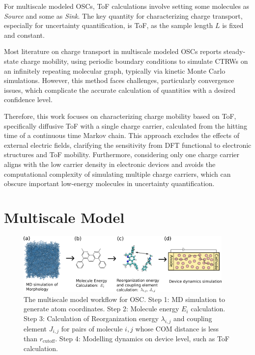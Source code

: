 \documentclass[letterpaper,12pt]{article}
\begin{document}
For multiscale modeled OSCs, ToF calculations involve setting some molecules as \textit{Source} and some as \textit{Sink}. The key quantity for characterizing charge transport, especially for uncertainty quantification, is ToF, as the sample length $L$ is fixed and constant.

Most literature on charge transport in multiscale modeled OSCs reports steady-state charge mobility, using periodic boundary conditions to simulate CTRWs on an infinitely repeating molecular graph, typically via kinetic Monte Carlo simulations. However, this method faces challenges, particularly convergence issues, which complicate the accurate calculation of quantities with a desired confidence level.

Therefore, this work focuses on characterizing charge mobility based on ToF, specifically diffusive ToF with a single charge carrier, calculated from the hitting time of a continuous time Markov chain. This approach excludes the effects of external electric fields, clarifying the sensitivity from DFT functional to electronic structures and ToF mobility. 
Furthermore, considering only one charge carrier aligns with the low carrier density in electronic devices and avoids the computational complexity of simulating multiple charge carriers, which can obscure important low-energy molecules in uncertainty quantification.

\section{Multiscale Model}
\label{sec:MSM}

\begin{figure}[h]
    \centering
    \includegraphics[width=0.95\textwidth]{figs/MSM.png}
    \caption{The multiscale model workflow for OSC. Step 1: MD simulation to generate atom coordinates. Step 2: Molecule energy $E_i$ calculation. Step 3: Calculation of Reorganization energy $\lambda_{i,j}$ and coupling element $J_{i,j}$ for pairs of molecule $i,j$ whose COM distance is less than $r_\text{cutoff}$. Step 4: Modelling dynamics on device level, such as ToF calculation.}
    \label{fig:MSM}
\end{figure}
\end{document}
